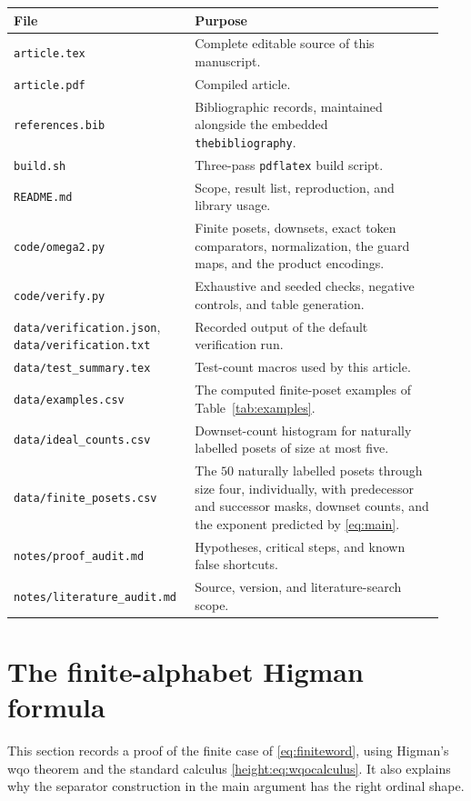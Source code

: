\documentclass[11pt,a4paper]{article}
\numberwithin{equation}{section}
\theoremstyle{definition}
\theoremstyle{remark}
\begin{document}
\begin{longtable}{@{}>{\raggedright\arraybackslash}p{0.38\linewidth}>{\raggedright\arraybackslash}p{0.56\linewidth}@{}}
\toprule
File & Purpose\\
\midrule
\endhead
\texttt{article.tex} & Complete editable source of this manuscript.\\
\texttt{article.pdf} & Compiled article.\\
\texttt{references.bib} & Bibliographic records, maintained alongside the
  embedded \texttt{thebibliography}.\\
\texttt{build.sh} & Three-pass \texttt{pdflatex} build script.\\
\texttt{README.md} & Scope, result list, reproduction, and library usage.\\
\texttt{code/omega2.py} & Finite posets, downsets, exact token comparators,
  normalization, the guard maps, and the product encodings.\\
\texttt{code/verify.py} & Exhaustive and seeded checks, negative controls,
  and table generation.\\
\texttt{data/verification.json}, \texttt{data/verification.txt}
  & Recorded output of the default verification run.\\
\texttt{data/test\_summary.tex} & Test-count macros used by this article.\\
\texttt{data/examples.csv} & The computed finite-poset examples of
  Table~\ref{tab:examples}.\\
\texttt{data/ideal\_counts.csv} & Downset-count histogram for naturally
  labelled posets of size at most five.\\
\texttt{data/finite\_posets.csv} & The $50$ naturally labelled posets through
  size four, individually, with predecessor and successor masks, downset
  counts, and the exponent predicted by \eqref{eq:main}.\\
\texttt{notes/proof\_audit.md} & Hypotheses, critical steps, and known false
  shortcuts.\\
\texttt{notes/literature\_audit.md} & Source, version, and literature-search
  scope.\\
\bottomrule
\end{longtable}

\section{The finite-alphabet Higman formula}\label{height:app:higman}

This section records a proof of the finite case of
\eqref{eq:finiteword}, using Higman's wqo theorem and the standard calculus
\eqref{height:eq:wqocalculus}. It also explains why the separator construction
in the main argument has the right ordinal shape.
\end{document}
